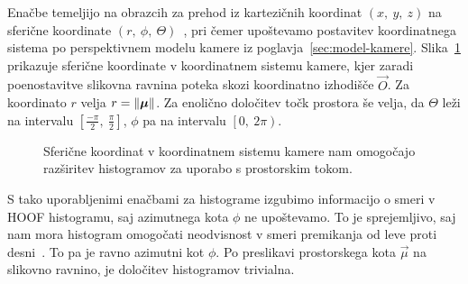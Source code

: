 Enačbe temeljijo na obrazcih za prehod iz kartezičnih koordinat $(x, ~y, ~z)$ na sferične koordinate $(r,~\phi,~\Theta)$~\cite{bronstein1990math}, pri čemer upoštevamo postavitev koordinatnega sistema po perspektivnem modelu kamere iz poglavja~\ref{sec:model-kamere}. Slika~\ref{fig:sphere} prikazuje sferične koordinate v koordinatnem sistemu kamere, kjer zaradi poenostavitve slikovna ravnina poteka skozi koordinatno izhodišče $\vec{O}$. Za koordinato $r$ velja $r=\left\lVert {\boldsymbol{\mu}} \right\rVert$. Za enolično določitev točk prostora še velja, da $\Theta$ leži na intervalu $\left[\frac{-\pi}{2},~\frac{\pi}{2}\right]$, $\phi$ pa na intervalu $\left[0,~2\pi\right)$.

\begin{figure}[htb]
	\centering
	
	\caption[Sferične koordinate v koordinatnem sistemu kamere]{Sferične koordinat v koordinatnem sistemu kamere nam omogočajo razširitev histogramov za uporabo s prostorskim tokom.}
	\label{fig:sphere}
\end{figure}

S tako uporabljenimi enačbami za histograme izgubimo informacijo o smeri v HOOF histogramu, saj azimutnega kota $\phi$ ne upoštevamo. To je sprejemljivo, saj nam mora histogram omogočati neodvisnost v smeri premikanja od leve proti desni~\cite{chaudhry2009histograms}. To pa je ravno azimutni kot $\phi$. Po preslikavi prostorskega kota $\vec{\mu}$ na slikovno ravnino, je določitev histogramov trivialna. 
